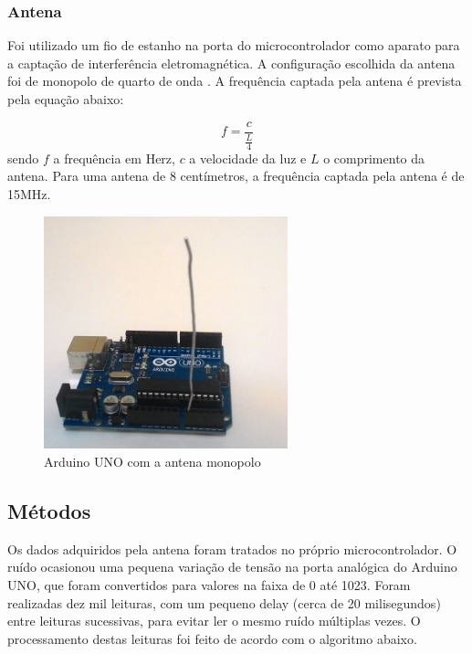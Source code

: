 \subsubsection{Antena}

Foi utilizado um fio de estanho na porta do microcontrolador como aparato para a captação de interferência eletromagnética. A configuração escolhida da antena foi de monopolo de quarto de onda \cite{Balanis2005}.
A frequência captada pela antena é prevista pela equação abaixo:

\begin{equation}
   f = \frac{c}{\frac{L}{4}}
  \end{equation}
sendo $f$ a frequência em Herz, $c$ a velocidade da luz e $L$ o comprimento da antena. Para uma antena de 8 centímetros, a frequência
captada pela antena é de 15MHz.
 \begin{figure}[H]
 	\label{fig2}
 	\begin{centering}
 		\includegraphics[width = 200pt]{img/arduino2.png}
 		\caption{Arduino UNO com a antena monopolo}
 	\end{centering}	
 		
 \end{figure}

\subsection{Métodos}

Os dados adquiridos pela antena foram tratados no próprio microcontrolador. O ruído ocasionou uma pequena variação de tensão
na porta analógica do Arduino UNO, que foram convertidos para valores na faixa de 0 até 1023. Foram realizadas dez mil leituras, com um
pequeno delay (cerca de 20 milisegundos) entre leituras sucessivas, para evitar ler o mesmo ruído múltiplas vezes. O processamento destas
leituras foi feito de acordo com o algoritmo abaixo.

